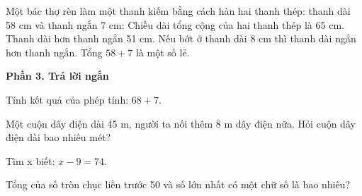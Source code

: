 \begin{ex} %
Một bác thợ rèn làm một thanh kiếm bằng cách hàn hai thanh thép: thanh dài 58 cm và thanh ngắn 7 cm:
\choiceTF
{\True Chiều dài tổng cộng của hai thanh thép là 65 cm.}
{\True Thanh dài hơn thanh ngắn 51 cm.}
{Nếu bớt ở thanh dài 8 cm thì thanh dài ngắn hơn thanh ngắn.}
{\True Tổng $58 + 7$ là một số lẻ.}
\end{ex}

\textbf{Phần 3. Trả lời ngắn}

\begin{ex} %
Tính kết quả của phép tính: $68 + 7$.
\end{ex}

\begin{ex} %
Một cuộn dây điện dài 45 m, người ta nối thêm 8 m dây điện nữa. Hỏi cuộn dây điện dài bao nhiêu mét?
\end{ex}

\begin{ex} %
Tìm x biết: $x - 9 = 74$.
\end{ex}

\begin{ex} %
Tổng của số tròn chục liền trước 50 và số lớn nhất có một chữ số là bao nhiêu?
\end{ex}

